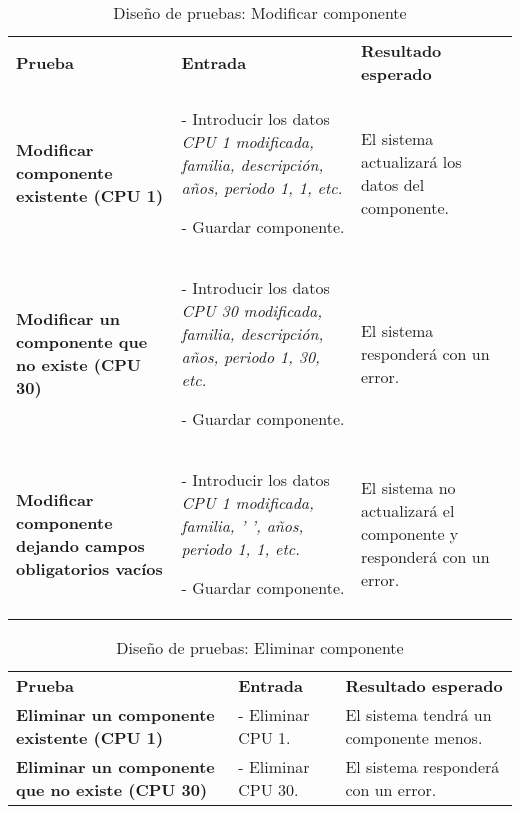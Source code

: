 \begin{table}[H]
\vspace{-4mm}
  \centering
  \caption{Diseño de pruebas: Modificar componente}
    \begin{tabular}{p{13em}p{11em}p{12em}}
    \toprule
    \rowcolor[rgb]{ .851,  .886,  .953} \multicolumn{3}{p{36em}}{\textbf{Modificar componente}} \\ \midrule
    \rowcolor[rgb]{ .949,  .949,  .949} \textbf{Prueba} & \textbf{Entrada} & \textbf{Resultado esperado}\\ \midrule
    \textbf{Modificar componente existente (CPU 1)} & - Introducir los datos \textit{CPU 1 modificada, familia, descripción, años, periodo 1, 1, etc.}\par - Guardar componente. & El sistema actualizará los datos del componente. \\ \midrule
    \textbf{Modificar un componente que no existe (CPU 30)} & - Introducir los datos \textit{CPU 30 modificada, familia, descripción, años, periodo 1, 30, etc.}\par - Guardar componente. & El sistema responderá con un error. \\ \midrule
    \textbf{Modificar componente dejando campos obligatorios vacíos} & - Introducir los datos \textit{CPU 1 modificada, familia, ' ', años, periodo 1, 1, etc.}\par - Guardar componente. & El sistema no actualizará el componente y responderá con un error. \\ \bottomrule
    \end{tabular}%
\end{table}%
\begin{table}[H]
\vspace{-4mm}
  \centering
  \caption{Diseño de pruebas: Eliminar componente}
    \begin{tabular}{p{13em}p{11em}p{12em}}
    \toprule
    \rowcolor[rgb]{ .851,  .886,  .953} \multicolumn{3}{p{36em}}{\textbf{Eliminar componente}} \\ \midrule
    \rowcolor[rgb]{ .949,  .949,  .949} \textbf{Prueba} & \textbf{Entrada} & \textbf{Resultado esperado}\\ \midrule
    \textbf{Eliminar un componente existente (CPU 1)} & - Eliminar CPU 1. & El sistema tendrá un componente menos. \\ \midrule
    \textbf{Eliminar un componente que no existe (CPU 30)} & - Eliminar CPU 30. & El sistema responderá con un error. \\ \bottomrule
    \end{tabular}%
\end{table}%


